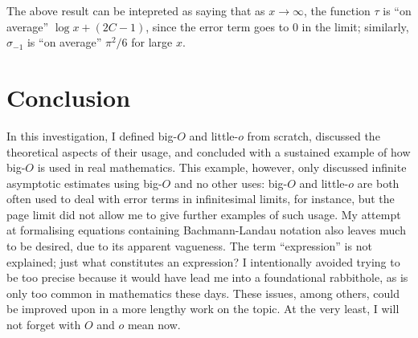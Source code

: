 \documentclass{article}
\theoremstyle{definition}
\begin{document}
The above result can be intepreted as saying that as \(x\to\infty\), the function \(\tau\) is ``on average'' \(\log x + (2C-1)\), since the error term goes to \(0\) in the limit;
similarly, \(\sigma_{-1}\) is ``on average'' \(\pi^2/6\) for large \(x\).

\section{Conclusion}\label{ssec:conclusion}

In this investigation, I defined big-$O$ and little-$o$ from scratch, discussed the theoretical aspects of their usage, and concluded with a sustained example of how big-$O$ is used in real mathematics.
This example, however, only discussed infinite asymptotic estimates using big-$O$ and no other uses: big-$O$ and little-$o$ are both often used to deal with error terms in infinitesimal limits, for instance, but the page limit did not allow me to give further examples of such usage.
My attempt at formalising equations containing Bachmann-Landau notation also leaves much to be desired, due to its apparent vagueness.
The term ``expression'' is not explained; just what constitutes an expression?
I intentionally avoided trying to be too precise because it would have lead me into a foundational rabbithole, as is only too common in mathematics these days.
These issues, among others, could be improved upon in a more lengthy work on the topic.
At the very least, I will not forget with \(O\) and \(o\) mean now.

\nocite{*}
\printbibliography
\end{document}
